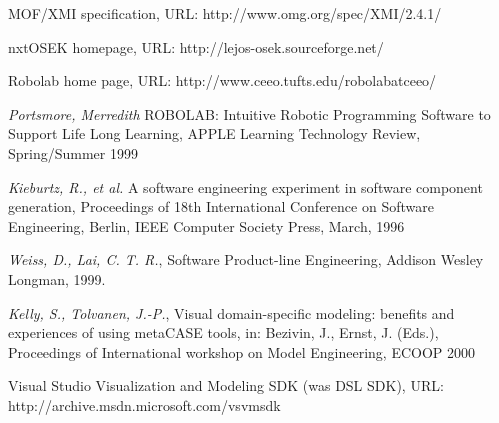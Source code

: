 \documentclass[a4paper]{article}
\begin{document}
\begin{thebibliography}{9001}
   MOF/XMI specification, URL: http://www.omg.org/spec/XMI/2.4.1/ 

   nxtOSEK homepage, URL: http://lejos-osek.sourceforge.net/ 

   Robolab home page, URL: http://www.ceeo.tufts.edu/robolabatceeo/ 

   \emph{Portsmore, Merredith} ROBOLAB: Intuitive Robotic Programming Software to Support Life Long Learning, APPLE Learning Technology Review, Spring/Summer 1999

   \emph{Kieburtz, R., et al.} A software engineering experiment in software component generation, Proceedings of 18th International Conference on Software Engineering, Berlin, IEEE Computer Society Press, March, 1996

   \emph{Weiss, D., Lai, C. T. R.}, Software Product-line Engineering, Addison Wesley Longman, 1999.

   \emph{Kelly, S., Tolvanen, J.-P.}, Visual domain-specific modeling: benefits and experiences of using metaCASE tools, in: Bezivin, J., Ernst, J. (Eds.), Proceedings of International workshop on Model Engineering, ECOOP 2000

   Visual Studio Visualization and Modeling SDK (was DSL SDK), URL: http://archive.msdn.microsoft.com/vsvmsdk 

\end{thebibliography}
\end{document}
